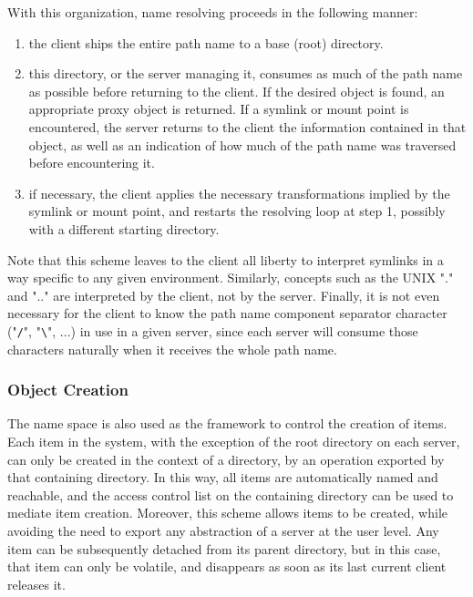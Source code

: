 With this organization, name resolving proceeds in the following
manner:
\begin{enumerate}
\item the client ships the entire path name to a base (root)
directory.

\item this directory, or the server managing it, consumes as much of
the path name as possible before returning to the client. If the
desired object is found, an appropriate proxy object is
returned. If a symlink or mount point is encountered, the server
returns to the client the information contained in that object, as
well as an indication of how much of the path name was traversed
before encountering it.

\item if necessary, the client applies the necessary transformations
implied by the symlink or mount point, and restarts the resolving loop
at step 1, possibly with a different starting directory.
\end{enumerate}

Note that this scheme leaves to the client all liberty to interpret
symlinks in a way specific to any given environment. Similarly,
concepts such as the UNIX "." and ".." are interpreted by the client,
not by the server. Finally, it is not even necessary for the client to
know the path name component separator character ("\verb+/+",
"\verb+\+", ...) in use in a given server, since each server will
consume those characters naturally when it receives the whole path
name.

\subsubsection{Object Creation}

The name space is also used as the framework to control the creation
of items. Each item in the system, with the exception of the root
directory on each server, can only be created in the context of a
directory, by an operation exported by that containing directory. In
this way, all items are automatically named and reachable, and the
access control list on the containing directory can be used to mediate
item creation. Moreover, this scheme allows items to be created, while
avoiding the need to export any abstraction of a server at the user
level. Any item can be subsequently detached from its parent
directory, but in this case, that item can only be volatile, and
disappears as soon as its last current client releases it.

